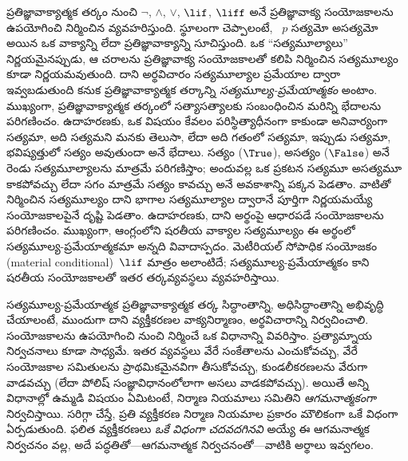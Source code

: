 \documentclass[../../../include/open-logic-section]{subfiles}
\begin{document}


ప్రతిజ్ఞావాక్యాత్మక తర్కం  నుంచి $\lnot$, $\land$,
$\lor$, $\lif$, $\liff$ అనే ప్రతిజ్ఞావాక్య సంయోజకాలను ఉపయోగించి నిర్మించిన
 వ్యవహరిస్తుంది. స్థూలంగా చెప్పాలంటే,
~$p$ సత్యమో అసత్యమో అయిన ఒక వాక్యాన్ని
లేదా ప్రతిజ్ఞావాక్యాన్ని సూచిస్తుంది. ఒక 
 “సత్యమూల్యాలు” నిర్ణయమైనప్పుడు,
ఆ చరాలను ప్రతిజ్ఞావాక్య సంయోజకాలతో కలిపి నిర్మించిన  సత్యమూల్యం కూడా
నిర్ణయమవుతుంది. దాని అర్థవిచారం సత్యమూల్యాల ప్రమేయాల ద్వారా
ఇవ్వబడుతుంది కనుక ప్రతిజ్ఞావాక్యాత్మక తర్కాన్ని \emph{సత్యమూల్య-ప్రమేయాత్మకం}
అంటాం. ముఖ్యంగా, ప్రతిజ్ఞావాక్యాత్మక తర్కంలో సత్యాసత్యాలకు సంబంధించిన మరిన్ని
భేదాలను పరిగణించం. ఉదాహరణకు, ఒక విషయం కేవలం
పరిస్థిత్యాధీనంగా కాకుండా అనివార్యంగా సత్యమా, అది సత్యమని మనకు
తెలుసా, లేదా అది గతంలో సత్యమా, ఇప్పుడు సత్యమా, భవిష్యత్తులో సత్యం
అవుతుందా అనే భేదాలు. సత్యం ($\True$), అసత్యం
($\False$) అనే రెండు సత్యమూల్యాలను మాత్రమే పరిగణిస్తాం; అందువల్ల ఒక
ప్రకటన సత్యమూ అసత్యమూ కాకపోవచ్చు లేదా సగం మాత్రమే సత్యం కావచ్చు అనే
అవకాశాన్ని పక్కన పెడతాం. వాటితో నిర్మించిన 
సత్యమూల్యం దాని భాగాల సత్యమూల్యాల ద్వారానే పూర్తిగా నిర్ణయమయ్యే
సంయోజకాలపైనే దృష్టి పెడతాం. ఉదాహరణకు, దాని అర్థంపై ఆధారపడే
సంయోజకాలను పరిగణించం. ముఖ్యంగా, ఆంగ్లంలోని షరతీయ వాక్యాల
సత్యమూల్యం ఈ అర్థంలో సత్యమూల్య-ప్రమేయాత్మకమా అన్నది వివాదాస్పదం.
మెటీరియల్ సోపాధిక సంయోజకం (material conditional)~$\lif$ మాత్రం అలాంటిదే; సత్యమూల్య-ప్రమేయాత్మకం
కాని షరతీయ సంయోజకాలతో ఇతర తర్కవ్యవస్థలు వ్యవహరిస్తాయి.

సత్యమూల్య-ప్రమేయాత్మక ప్రతిజ్ఞావాక్యాత్మక తర్క సిద్ధాంతాన్ని, అధిసిద్ధాంతాన్ని
అభివృద్ధి చేయాలంటే, ముందుగా దాని వ్యక్తీకరణల వాక్యనిర్మాణం,
అర్థవిచారాన్ని నిర్వచించాలి. సంయోజకాలను ఉపయోగించి
 నుంచి  నిర్మించే ఒక
విధానాన్ని వివరిస్తాం. ప్రత్యామ్నాయ నిర్వచనాలు కూడా సాధ్యమే. ఇతర
వ్యవస్థలు వేరే సంకేతాలను ఎంచుకోవచ్చు, వేరే సంయోజకాల సమితులను
ప్రాథమికమైనవిగా తీసుకోవచ్చు, కుండలీకరణలను వేరుగా వాడవచ్చు (లేదా
పోలిష్ సంజ్ఞావిధానంలోలాగా అసలు వాడకపోవచ్చు). అయితే అన్ని విధానాల్లో
ఉమ్మడి విషయం ఏమిటంటే, నిర్మాణ నియమాలు  సమితిని
\emph{ఆగమనాత్మకంగా} నిర్వచిస్తాయి. సరిగ్గా చేస్తే, ప్రతి వ్యక్తీకరణ
నిర్మాణ నియమాల ప్రకారం మౌలికంగా ఒకే విధంగా ఏర్పడుతుంది. ఫలిత
వ్యక్తీకరణలు \emph{ఒకే విధంగా చదవదగినవి} అయ్యే ఈ ఆగమనాత్మక నిర్వచనం
వల్ల, అదే పద్ధతితో---ఆగమనాత్మక నిర్వచనంతో---వాటికి అర్థాలు
ఇవ్వగలం.
\end{document}
